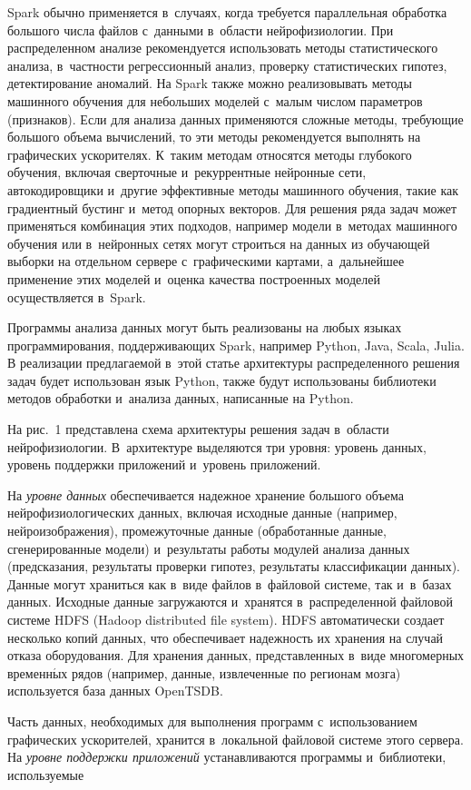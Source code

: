 \begin{multicols}{2}
    Spark обычно применяется в~случаях, когда требуется параллельная 
обработка большого чис\-ла файлов с~данными в~об\-ласти нейрофизиологии. 
При распределенном анализе рекомендуется использовать методы 
статистического анализа, в~част\-ности регрессионный анализ, проверку 
статистических гипотез, детектирование аномалий. На Spark также можно 
реализовывать методы машинного обучения для небольших моделей 
с~малым числом параметров (признаков). Если для анализа данных 
применяются сложные методы, тре\-бу\-ющие большого объема вы\-чис\-ле\-ний, то 
эти методы рекомендуется выполнять на графических ускорителях. К~таким 
методам относятся методы глубокого обуче\-ния, включая сверточные 
и~рекуррентные нейронные сети, автокодировщики и~другие эффективные 
методы машинного обучения, такие как градиентный бустинг и~метод 
опорных векторов. Для решения ряда задач может применяться комбинация 
этих подходов, например модели в~методах машинного обучения или 
в~нейронных сетях могут строиться на данных из обучающей выборки на 
отдельном сервере с~графическими картами, а~дальнейшее применение этих 
моделей и~оценка качества построенных моделей осуществляется в~Spark.
    
    Программы анализа данных могут быть реализованы на любых языках 
программирования, поддерживающих Spark, например Python, Java, Scala, 
Julia. В реализации предлагаемой в~этой статье архитектуры распределенного 
решения задач будет использован язык Python, также будут использованы 
библиотеки методов обработки и~анализа данных, написанные на Python.
    
    На рис.~1 представлена схема архитектуры решения задач в~области 
нейрофизиологии. В~архитектуре выделяются три уровня: уровень данных, 
уровень поддержки приложений и~уровень приложений.
    
    На \textit{уровне данных} обеспечивается надежное хранение большого 
объема нейрофизиологических данных, включая исходные данные 
(например, нейро\-изоб\-ра\-же\-ния), промежуточные данные (обработанные 
данные, сгенерированные модели) и~результаты работы модулей анализа 
данных (предсказания, результаты проверки гипотез, результаты 
классификации данных). Данные могут храниться как в~виде файлов 
в~файловой системе, так и~в~базах данных. Исходные данные загружаются 
и~хранятся в~распределенной файловой системе HDFS (Hadoop distributed file system). HDFS автоматически 
создает несколько копий данных, что обеспечивает надежность их хранения 
на случай отказа оборудования. Для хранения данных, представленных 
в~виде многомерных временн$\acute{\mbox{ы}}$х рядов (например, данные, извлеченные по 
регионам мозга) используется база данных OpenTSDB. 
    


    Часть данных, необходимых для выполнения программ 
с~использованием графических ускорителей, хранится в~локальной файловой 
сис\-те\-ме этого сервера. На \textit{уровне поддержки приложений} 
уста\-нав\-ли\-ва\-ют\-ся программы и~биб\-лио\-те\-ки, ис\-поль\-зу\-емые\linebreak\vspace*{-12pt}

\pagebreak

\end{multicols}

